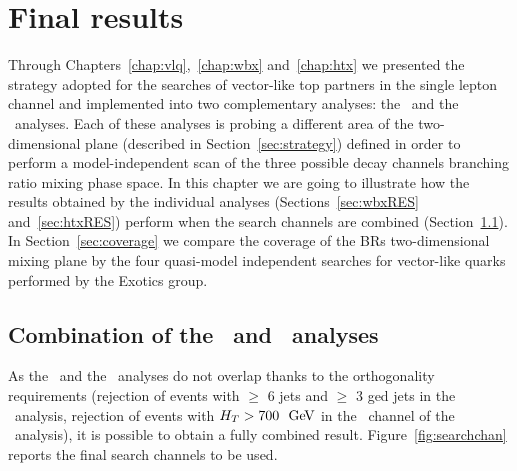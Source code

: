 \clearpage{\pagestyle{empty}\cleardoublepage}

\chapter{Final results}\label{chap:results}

Through Chapters~\ref{chap:vlq},~\ref{chap:wbx} and~\ref{chap:htx}
we presented the strategy adopted for the searches of vector-like
top partners in the single lepton channel and implemented into
two complementary analyses: the \wbx\ and the \htx\ analyses.
Each of these analyses is probing a different
area of the two-dimensional plane (described in Section~\ref{sec:strategy}) 
defined in order to perform
a model-independent scan of the three possible decay channels branching ratio 
mixing phase space.
In this chapter we are going to illustrate how the results
obtained by the individual analyses (Sections~\ref{sec:wbxRES} 
and~\ref{sec:htxRES}) perform when the search channels are
combined (Section~\ref{sec:results_comb}).
In Section~\ref{sec:coverage} we compare
the coverage of the BRs two-dimensional
mixing plane by the four quasi-model independent
searches for vector-like quarks performed
by the Exotics group.


\section{Combination of the \wbx\ and \htx\ analyses}\label{sec:results_comb}

As the \wbx\ and the \htx\ analyses do not overlap
thanks to the orthogonality requirements (rejection of
events with $\geq$ 6 jets and $\geq$ 3 \btag ged jets
in the \wbx\ analysis, rejection of events with $H_T>700~\gev$
in the \chii\ channel of the \htx\ analysis), it is possible
to obtain a fully combined result. Figure~\ref{fig:searchchan}
reports the final search channels to be used.

